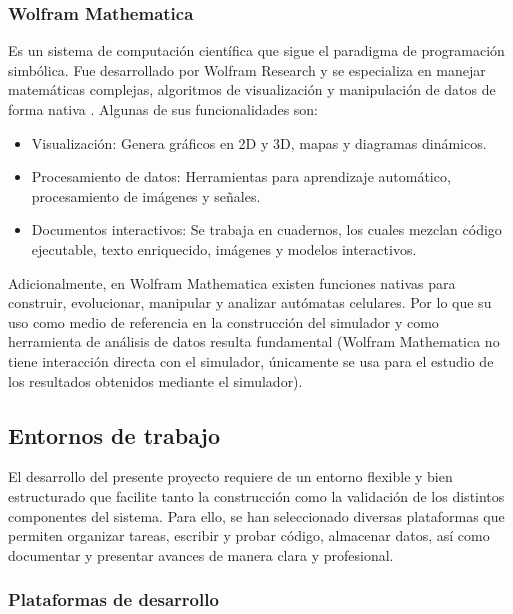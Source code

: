 \subsubsection{Wolfram Mathematica}

Es un sistema de computación científica que sigue el paradigma de programación simbólica. Fue desarrollado por Wolfram Research y se especializa en manejar matemáticas complejas, algoritmos de visualización y manipulación de datos de forma nativa \cite{mathematica_2024}. Algunas de sus funcionalidades son:
\begin{itemize}
	\item Visualización: Genera gráficos en 2D y 3D, mapas y diagramas dinámicos.
	
	\item Procesamiento de datos: Herramientas para aprendizaje automático, procesamiento de imágenes y señales.
	
	\item Documentos interactivos: Se trabaja en cuadernos, los cuales mezclan código ejecutable, texto enriquecido, imágenes y modelos interactivos.
\end{itemize}

Adicionalmente, en Wolfram Mathematica existen funciones nativas para construir, evolucionar, manipular y analizar autómatas celulares. Por lo que su uso como medio de referencia en la construcción del simulador y como herramienta de análisis de datos resulta fundamental (Wolfram Mathematica no tiene interacción directa con el simulador, únicamente se usa para el estudio de los resultados obtenidos mediante el simulador).

\subsection{Entornos de trabajo}

El desarrollo del presente proyecto requiere de un entorno flexible y bien estructurado que facilite tanto la construcción como la validación de los distintos componentes del sistema. Para ello, se han seleccionado diversas plataformas que permiten organizar tareas, escribir y probar código, almacenar datos, así como documentar y presentar avances de manera clara y profesional.

\subsubsection{Plataformas de desarrollo}


